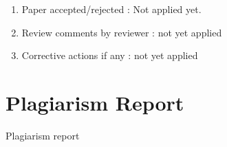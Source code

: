 \documentclass[oneside,a4paper,12pt]{report}
\begin{document}
\begin{appendices}
\begin{enumerate}
\item Paper accepted/rejected : Not applied yet. 
\item Review comments by reviewer : not yet applied 
\item Corrective actions if any :   not yet applied 

\end{enumerate}

\chapter{Plagiarism Report}
Plagiarism report


\end{appendices}
\end{document}
